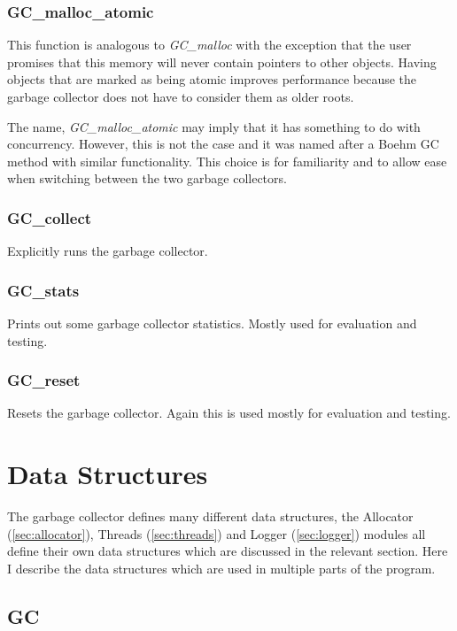 \documentclass[../diss.tex]{subfiles}
\begin{document}
\subsubsection{GC\_malloc\_atomic}
This function is analogous to \emph{GC\_malloc} with the exception that the user promises that this memory will never contain pointers to other objects. Having objects that are marked as being atomic improves performance because the garbage collector does not have to consider them as older roots.

The name, \emph{GC\_malloc\_atomic} may imply that it has something to do with concurrency. However, this is not the case and it was named after a Boehm GC method with similar functionality. This choice is for familiarity and to allow ease when switching between the two garbage collectors.

\subsubsection{GC\_collect}
Explicitly runs the garbage collector.

\subsubsection{GC\_stats}
Prints out some garbage collector statistics. Mostly used for evaluation and testing.

\subsubsection{GC\_reset}
Resets the garbage collector. Again this is used mostly for evaluation and testing.

\section{Data Structures}
\label{sec:datastructures}

The garbage collector defines many different data structures, the Allocator (\cref{sec:allocator}), Threads (\cref{sec:threads}) and Logger (\cref{sec:logger}) modules all define their own data structures which are discussed in the relevant section. Here I describe the data structures which are used in multiple parts of the program.

\subsection{GC}
\end{document}
